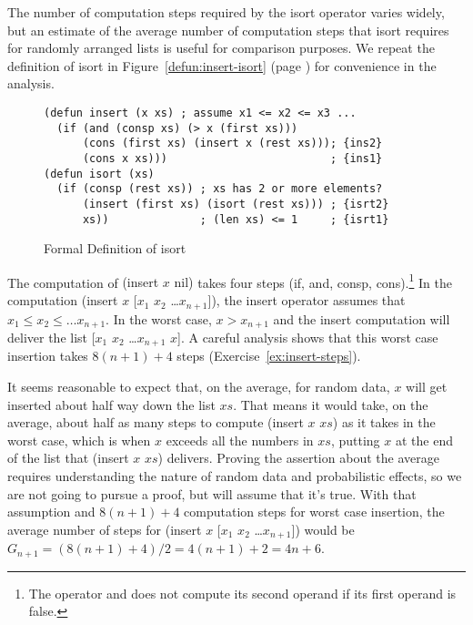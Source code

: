 The number of computation steps required by the
\textsf{isort} operator
varies widely, but
an estimate of the average number of computation steps that
\textsf{isort} requires for randomly arranged lists
is useful for comparison purposes.
We repeat the definition of \textsf{isort}
in Figure~\ref{defun:insert-isort} (page \pageref{defun:insert-isort})
for convenience in the analysis.

\begin{figure}
\begin{Verbatim}
(defun insert (x xs) ; assume x1 <= x2 <= x3 ...
  (if (and (consp xs) (> x (first xs)))
      (cons (first xs) (insert x (rest xs))); {ins2}
      (cons x xs)))                         ; {ins1}
(defun isort (xs)
  (if (consp (rest xs)) ; xs has 2 or more elements?
      (insert (first xs) (isort (rest xs))) ; {isrt2}
      xs))              ; (len xs) <= 1     ; {isrt1}
\end{Verbatim}
\caption{Formal Definition of \textsf{isort}}
\label{defun:insert-isort}\label{defun:isort-copy}
\end{figure}

The computation of \textsf{(insert $x$ nil)}
takes four steps
(\textsf{if}, \textsf{and}, \textsf{consp},
\textsf{cons}).\footnote{The operator \textsf{and}
does not compute its second operand if its first operand
is false.}
In the computation \textsf{(insert $x$ [$x_1$ $x_2$ \dots $x_{n+1}$])},
the \textsf{insert} operator assumes that
$x_1 \leq x_2 \leq \dots x_{n+1}$.
In the worst case, $x > x_{n+1}$ and the \textsf{insert} computation
will deliver the list [$x_1$ $x_2$ \dots $x_{n+1}$ $x$].
A careful analysis shows that this worst case insertion takes
$8(n+1)+4$ steps (Exercise~\ref{ex:insert-steps}).

It seems reasonable to expect that, on the average,
for random data, $x$ will get inserted about
half way down the list $xs$.
That means it would take, on the average, about
half as many steps to compute \textsf{(insert $x$ $xs$)}
as it takes in the worst case,
which is when $x$ exceeds all the numbers
in $xs$, putting $x$ at the end of the
list that \textsf{(insert $x$ $xs$)} delivers.
Proving the assertion about the average
requires understanding the nature of random
data and probabilistic effects, so we are not going
to pursue a proof, but will assume that it's true.
With that assumption and $8(n+1)+4$
computation steps for worst case insertion,
the average number of steps
for \textsf{(insert $x$ [$x_1$ $x_2$ \dots $x_{n+1}$])} would be
$G_{n+1} = (8(n+1)+4)/2 = 4(n+1)+2 = 4n+6$.

